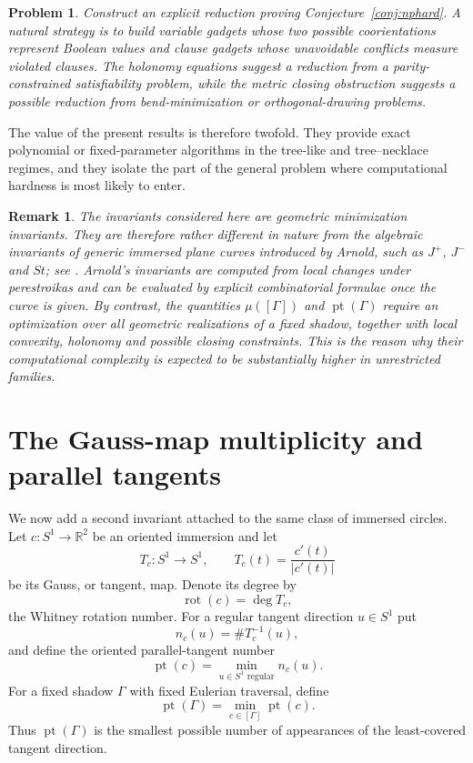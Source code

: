 \documentclass[11pt]{article}
\newtheorem{problem}[theorem]{Problem}
\newtheorem{remark}[theorem]{Remark}
\newcommand{\R}{\mathbb R}
\newcommand{\rot}{\operatorname{rot}}
\newcommand{\parnum}{\operatorname{pt}}
\begin{document}
\begin{problem}\label{prob:reduction}
Construct an explicit reduction proving Conjecture~\ref{conj:nphard}.  A natural strategy is to build variable gadgets whose two possible coorientations represent Boolean values and clause gadgets whose unavoidable conflicts measure violated clauses.  The holonomy equations suggest a reduction from a parity-constrained satisfiability problem, while the metric closing obstruction suggests a possible reduction from bend-minimization or orthogonal-drawing problems.
\end{problem}

The value of the present results is therefore twofold.  They provide exact polynomial or fixed-parameter algorithms in the tree-like and tree--necklace regimes, and they isolate the part of the general problem where computational hardness is most likely to enter.

\begin{remark}\label{rem:geometric-complexity}
The invariants considered here are geometric minimization invariants.  They are therefore rather different in nature from the algebraic invariants of generic immersed plane curves introduced by Arnold, such as $J^+$, $J^-$ and $St$; see \cite{ArnoldCaustics,ArnoldPlaneCurves}.  Arnold's invariants are computed from local changes under perestroikas and can be evaluated by explicit combinatorial formulae once the curve is given.  By contrast, the quantities $\mu([\Gamma])$ and $\parnum(\Gamma)$ require an optimization over all geometric realizations of a fixed shadow, together with local convexity, holonomy and possible closing constraints.  This is the reason why their computational complexity is expected to be substantially higher in unrestricted families.
\end{remark}

\section{The Gauss-map multiplicity and parallel tangents}

We now add a second invariant attached to the same class of immersed circles.  Let $c:S^1\to\R^2$ be an oriented immersion and let
\[
 T_c:S^1\to S^1,\qquad T_c(t)=\frac{c'(t)}{|c'(t)|}
\]
be its Gauss, or tangent, map.  Denote its degree by
\[
 \rot(c)=\deg T_c,
\]
the Whitney rotation number.  For a regular tangent direction $u\in S^1$ put
\[
 n_c(u)=\#T_c^{-1}(u),
\]
and define the oriented parallel-tangent number
\[
 \parnum(c)=\min_{u\in S^1\text{ regular}} n_c(u).
\]
For a fixed shadow $\Gamma$ with fixed Eulerian traversal, define
\[
 \parnum(\Gamma)=\min_{c\in[\Gamma]}\parnum(c).
\]
Thus $\parnum(\Gamma)$ is the smallest possible number of appearances of the least-covered tangent direction.
\end{document}
